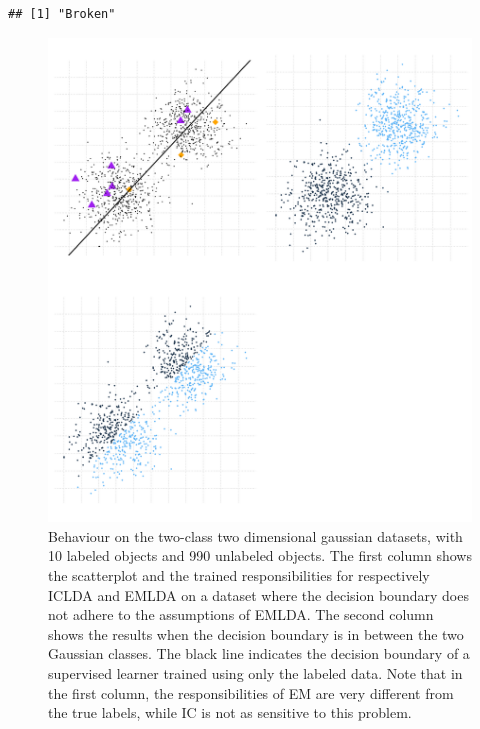 \begin{knitrout}
\color{fgcolor}\begin{kframe}


{\ttfamily\noindent\itshape\color{messagecolor}{\#\# Loading required package: gridExtra}}\begin{verbatim}
## [1] "Broken"
\end{verbatim}


{\ttfamily\noindent\bfseries{}}\end{kframe}\begin{figure}
\includegraphics[width=\maxwidth]{figure/toyplots-1} \caption[Behaviour on the two-class two dimensional gaussian datasets, with 10 labeled objects and 990 unlabeled objects]{Behaviour on the two-class two dimensional gaussian datasets, with 10 labeled objects and 990 unlabeled objects. The first column shows the scatterplot and the trained responsibilities for respectively ICLDA and EMLDA on a dataset where the decision boundary does not adhere to the assumptions of EMLDA. The second column shows the results when the decision boundary is in between the two Gaussian classes. The black line indicates the decision boundary of a supervised learner trained using only the labeled data. Note that in the first column, the responsibilities of EM are very different from the true labels, while IC is not as sensitive to this problem.}\label{fig:toyplots}
\end{figure}


\end{knitrout}

